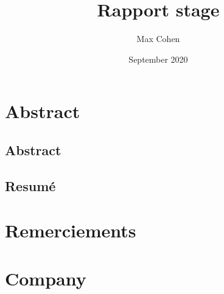 \documentclass[12pt]{article}
\title{Rapport stage}
\author{Max Cohen}
\date{September 2020}
\begin{document}
\begin{titlepage}
    \maketitle
\end{titlepage}

\tableofcontents

\section{Abstract}
\subsection{Abstract}

\subsection{Resumé}

\section{Remerciements}

\section{Company}
\end{document}
